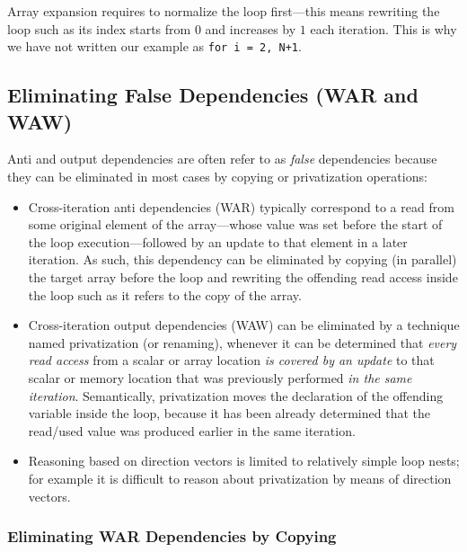 \documentclass[acmsmall,review]{acmart}\settopmatter{printfolios=true,printccs=false,printacmref=false}
\begin{document}
Array expansion requires to normalize the loop first---this means
rewriting the loop such as its index starts from $0$ and increases
by $1$ each iteration. This is why we have not written our example
as \lstinline{for i = 2, N+1}.

\subsection{Eliminating False Dependencies (WAR and WAW)}
\label{subsec:false-dep-elim}

Anti and output dependencies are often refer to as {\em false}
dependencies because they can be eliminated in most cases by
copying or privatization operations:
\begin{itemize}
    \item Cross-iteration anti dependencies (WAR) typically
        correspond to a read from some original element of 
        the array---whose value was set before the start of 
        the loop execution---followed by an update to that 
        element in a later iteration.  As such, this dependency
        can be eliminated by copying (in parallel) the target
        array before the loop and rewriting the offending
        read access inside the loop such as it refers
        to the copy of the array.\smallskip

    \item Cross-iteration output dependencies (WAW) can be
        eliminated by a technique named privatization (or renaming), 
        whenever it can be determined that {\em every read access} 
        from a scalar or array location {\em is covered by an
        update} to that scalar or memory location that was
        previously performed {\em in the same iteration}. 
        Semantically, privatization moves the declaration of the
        offending variable inside the loop, because it has been
        already determined that the read/used value was produced
        earlier in the same iteration.\smallskip

    \item Reasoning based on direction vectors is limited to 
        relatively simple loop nests; for example it is difficult 
        to reason about privatization by means of direction vectors.
\end  {itemize}

\subsubsection{Eliminating WAR Dependencies by Copying}
$\mbox{ }$\\
\end{document}
